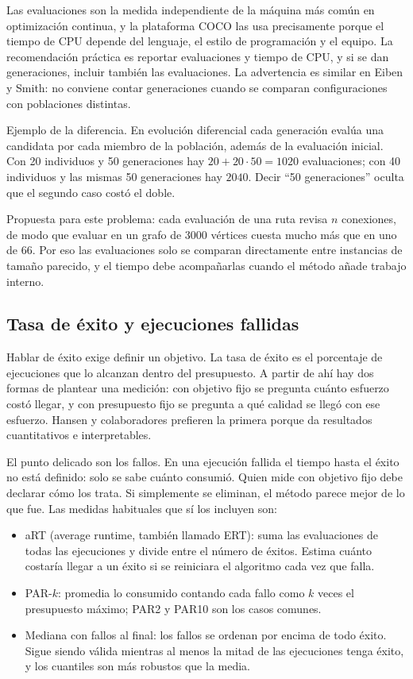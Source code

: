 Las evaluaciones son la medida independiente de la máquina más común en optimización continua, y la plataforma COCO las usa precisamente porque el tiempo de CPU depende del lenguaje, el estilo de programación y el equipo.\cite{de5,de6} La recomendación práctica es reportar evaluaciones y tiempo de CPU, y si se dan generaciones, incluir también las evaluaciones.\cite{de5} La advertencia es similar en Eiben y Smith: no conviene contar generaciones cuando se comparan configuraciones con poblaciones distintas.\cite{de7}

Ejemplo de la diferencia. En evolución diferencial cada generación evalúa una candidata por cada miembro de la población, además de la evaluación inicial. Con 20 individuos y 50 generaciones hay $20+20\cdot 50=1020$ evaluaciones; con 40 individuos y las mismas 50 generaciones hay $2040$. Decir ``50 generaciones'' oculta que el segundo caso costó el doble.

Propuesta para este problema: cada evaluación de una ruta revisa $n$ conexiones, de modo que evaluar en un grafo de 3000 vértices cuesta mucho más que en uno de 66. Por eso las evaluaciones solo se comparan directamente entre instancias de tamaño parecido, y el tiempo debe acompañarlas cuando el método añade trabajo interno.

\subsection{Tasa de éxito y ejecuciones fallidas}
Hablar de éxito exige definir un objetivo. La tasa de éxito es el porcentaje de ejecuciones que lo alcanzan dentro del presupuesto. A partir de ahí hay dos formas de plantear una medición: con objetivo fijo se pregunta cuánto esfuerzo costó llegar, y con presupuesto fijo se pregunta a qué calidad se llegó con ese esfuerzo. Hansen y colaboradores prefieren la primera porque da resultados cuantitativos e interpretables.\cite{de6}

El punto delicado son los fallos. En una ejecución fallida el tiempo hasta el éxito no está definido: solo se sabe cuánto consumió.\cite{de6} Quien mide con objetivo fijo debe declarar cómo los trata.\cite{de5} Si simplemente se eliminan, el método parece mejor de lo que fue. Las medidas habituales que sí los incluyen son:
\begin{itemize}[leftmargin=*]
\item aRT (average runtime, también llamado ERT): suma las evaluaciones de todas las ejecuciones y divide entre el número de éxitos. Estima cuánto costaría llegar a un éxito si se reiniciara el algoritmo cada vez que falla.\cite{de5,de6}
\item PAR-$k$: promedia lo consumido contando cada fallo como $k$ veces el presupuesto máximo; PAR2 y PAR10 son los casos comunes.\cite{de5}
\item Mediana con fallos al final: los fallos se ordenan por encima de todo éxito. Sigue siendo válida mientras al menos la mitad de las ejecuciones tenga éxito, y los cuantiles son más robustos que la media.\cite{de5}
\end{itemize}


